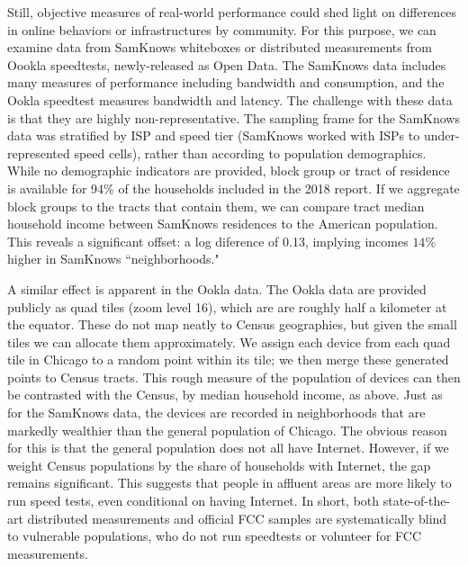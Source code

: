 \documentclass[11 pt]{amsart}
\begin{document}
Still, objective measures of real-world performance
could shed light on differences in online behaviors or
infrastructures by community.
For this purpose, we can examine data from SamKnows whiteboxes or
distributed measurements from Oookla speedtests, newly-released as Open Data.\cite{ookla}
The SamKnows data includes many measures of performance including bandwidth and consumption,
and the Ookla speedtest measures bandwidth and latency.
The challenge with these data is that they are highly non-representative.
The sampling frame for the SamKnows data was stratified by ISP and speed tier
(SamKnows worked with ISPs to under-represented speed cells),
rather than according to population demographics.\cite{samknows}
While no demographic indicators are provided,
block group or tract of residence is available for 94\% of the households included in the 2018 report.
If we aggregate block groups to the tracts that contain them,
we can compare tract median household income between SamKnows residences
to the American population.
This reveals a significant offset:
a log diference of 0.13, implying incomes $14$\% higher in SamKnows ``neighborhoods."


A similar effect is apparent in the Ookla data.
The Ookla data are provided publicly as quad tiles (zoom level 16),
which are are roughly half a kilometer at the equator.
These do not map neatly to Census geographies,
but given the small tiles  we can allocate them approximately.
We assign each device from each quad tile in Chicago
to a random point within its tile;
we then merge these generated points to Census tracts.
This rough measure of the population of devices
can then be contrasted with the Census, by median household income, as above.
Just as for the SamKnows data, the devices are recorded in
neighborhoods that are markedly wealthier than the general population of Chicago.
The obvious reason for this is that the general population does not all have Internet.
However, if we weight Census populations by the share of households with Internet,
the gap remains significant.
This suggests that people in affluent areas are more likely to run speed tests,
even conditional on having Internet.
In short, both state-of-the-art
distributed measurements and official FCC samples
are systematically blind to vulnerable populations,
who do not run speedtests or volunteer for FCC measurements.
\end{document}
